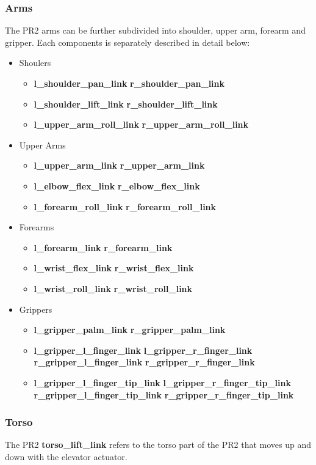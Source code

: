 \subsubsection{Arms}
The PR2 arms can be further subdivided into shoulder, upper arm, forearm and gripper.  Each components is separately described in detail below:
\begin{itemize}
\item Shoulers
  \begin{itemize}
  \item {\bf l\_shoulder\_pan\_link} {\bf r\_shoulder\_pan\_link}
  \item {\bf l\_shoulder\_lift\_link} {\bf r\_shoulder\_lift\_link}
  \item {\bf l\_upper\_arm\_roll\_link} {\bf r\_upper\_arm\_roll\_link}
  \end{itemize}
\item Upper Arms
  \begin{itemize}
  \item {\bf l\_upper\_arm\_link} {\bf r\_upper\_arm\_link}
  \item {\bf l\_elbow\_flex\_link} {\bf r\_elbow\_flex\_link}
  \item {\bf l\_forearm\_roll\_link} {\bf r\_forearm\_roll\_link}
  \end{itemize}
\item Forearms
  \begin{itemize}
  \item {\bf l\_forearm\_link} {\bf r\_forearm\_link}
  \item {\bf l\_wrist\_flex\_link} {\bf r\_wrist\_flex\_link}
  \item {\bf l\_wrist\_roll\_link} {\bf r\_wrist\_roll\_link}
  \end{itemize}
\item Grippers
  \begin{itemize}
  \item {\bf l\_gripper\_palm\_link} {\bf r\_gripper\_palm\_link}
  \item {\bf l\_gripper\_l\_finger\_link} {\bf l\_gripper\_r\_finger\_link}
        {\bf r\_gripper\_l\_finger\_link} {\bf r\_gripper\_r\_finger\_link}
  \item {\bf l\_gripper\_l\_finger\_tip\_link} {\bf l\_gripper\_r\_finger\_tip\_link}
        {\bf r\_gripper\_l\_finger\_tip\_link} {\bf r\_gripper\_r\_finger\_tip\_link}
  \end{itemize}
\end{itemize}


\subsubsection{Torso}
The PR2 {\bf torso\_lift\_link} refers to the torso part of the PR2 that moves up and down with the elevator actuator.

